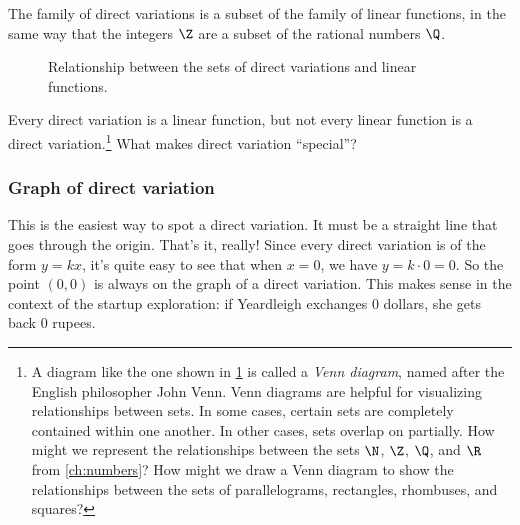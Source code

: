 The family of direct variations is a subset of the family of linear functions, in the same way that the integers $\Z$ are a subset of the rational numbers $\Q$.

\begin{figure}
\label{fig:dvvenn}
\caption{Relationship between the sets of direct variations and linear functions.}
\end{figure}

Every direct variation is a linear function, but not every linear function is a direct variation.\footnote{A diagram like the one shown in \cref{fig:dvvenn} is called a \textit{Venn diagram}, named after the English philosopher John Venn. Venn diagrams are helpful for visualizing relationships between sets. In some cases, certain sets are completely contained within one another. In other cases, sets overlap on partially. How might we represent the relationships between the sets $\N$, $\Z$, $\Q$, and $\R$ from \cref{ch:numbers}? How might we draw a Venn diagram to show the relationships between the sets of parallelograms, rectangles, rhombuses, and squares?} What makes direct variation ``special''?

\subsubsection{Graph of direct variation}

This is the easiest way to spot a direct variation. It must be a straight line that goes through the origin. That's it, really! Since every direct variation is of the form $y=kx$, it's quite easy to see that when $x=0$, we have $y = k\cdot0 = 0$. So the point $(0,0)$ is always on the graph of a direct variation. This makes sense in the context of the startup exploration: if Yeardleigh exchanges 0 dollars, she gets back 0 rupees.

\begin{center}
\end{center}

